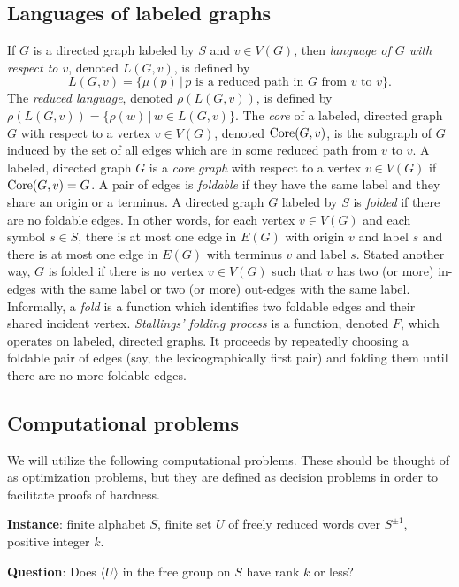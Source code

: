 \documentclass{article}
\newcommand{\FGR}{\textsc{Free Group Rank}}
\newcommand{\gen}[1]{\langle #1 \rangle}
\newcommand{\Core}{\textnormal{Core}}
\newcommand{\Spm}{S^{\pm1}}
\newcommand{\Instance}{\textbf{Instance}: }
\newcommand{\Question}{\textbf{Question}: }
\begin{document}
\subsection{Languages of labeled graphs}

If $G$ is a directed graph labeled by $S$ and $v \in V(G)$, then \emph{language of $G$ with respect to $v$}, denoted $L(G, v)$, is defined by
\begin{equation*}
  L(G, v) = \{ \mu(p) \, | \, p \text{ is a reduced path in } G \text{ from } v \text{ to } v\}.
\end{equation*}
The \emph{reduced language}, denoted $\rho(L(G, v))$, is defined by $\rho(L(G, v)) = \{ \rho(w) \, | \, w \in L(G, v) \}$.
The \emph{core} of a labeled, directed graph $G$ with respect to a vertex $v \in V(G)$, denoted $\Core(G, v)$, is the subgraph of $G$ induced by the set of all edges which are in some reduced path from $v$ to $v$.
A labeled, directed graph $G$ is a \emph{core graph} with respect to a vertex $v \in V(G)$ if $\Core(G, v) = G$.
A pair of edges is \emph{foldable} if they have the same label and they share an origin or a terminus.
A directed graph $G$ labeled by $S$ is \emph{folded} if there are no foldable edges.
In other words, for each vertex $v \in V(G)$ and each symbol $s \in S$, there is at most one edge in $E(G)$ with origin $v$ and label $s$ and there is at most one edge in $E(G)$ with terminus $v$ and label $s$.
Stated another way, $G$ is folded if there is no vertex $v \in V(G)$ such that $v$ has two (or more) in-edges with the same label or two (or more) out-edges with the same label.
Informally, a \emph{fold} is a function which identifies two foldable edges and their shared incident vertex.
\emph{Stallings' folding process} is a function, denoted $F$, which operates on labeled, directed graphs.
It proceeds by repeatedly choosing a foldable pair of edges (say, the lexicographically first pair) and folding them until there are no more foldable edges.

\subsection{Computational problems}

We will utilize the following computational problems.
These should be thought of as optimization problems, but they are defined as decision problems in order to facilitate proofs of hardness.
\begin{definition}[\FGR]
  \setlength{\parindent}{0pt}
  \mbox{}

  \Instance finite alphabet $S$, finite set $U$ of freely reduced words over $\Spm$, positive integer $k$.

  \Question Does $\gen{U}$ in the free group on $S$ have rank $k$ or less?
\end{definition}
\end{document}
